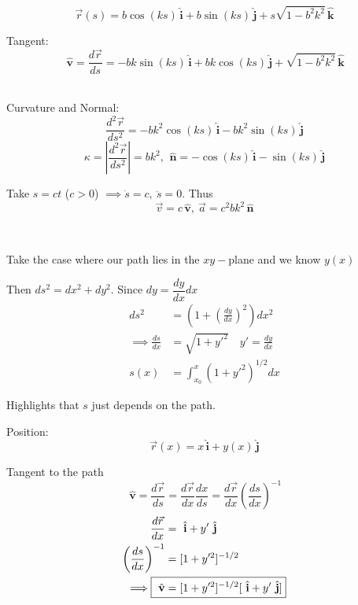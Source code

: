 \documentclass[twoside]{scrartcl}
\let\oldhat\hat
\renewcommand{\hat}[1]{\,\oldhat{\boldsymbol{\mathbf{#1}}}}
\begin{document}
\pagebreak


\begin{example}
	\[\vec{r}(s) = b\cos(ks)\hat{i} + b\sin(ks)\hat{j} + s\sqrt{1-b^2k^2}\hat{k}\]
	
	Tangent:
	\[\hat{v} = \frac{d\vec{r}}{ds} = -bk\sin(ks)\hat{i} + bk\cos(ks)\hat{j} + \sqrt{1-b^2k^2}\hat{k}\]~
	
	Curvature and Normal:
	\[\frac{d^2\vec{r}}{ds^2} = -bk^2\cos(ks)\hat{i} -bk^2 \sin(ks)\hat{j}\]
	\[\kappa =\left|\frac{d^2\vec{r}}{ds^2}\right| = bk^2,~ \hat{n} =  -\cos(ks)\hat{i} -\sin(ks)\hat{j}\]
	
Take $s = ct$ ($c >0$) $ \implies \dot{s} =c,~ \ddot{s} = 0$. Thus
\[\vec{v} = c\hat{v},~\vec{a} = c^2bk^2\hat{n}\]	
\end{example}~

Take the case where our path lies in the $xy-$plane and we know $y(x)$
\begin{center}
\end{center}

Then $ds^2 = dx^2 + dy^2$. Since $dy = \dfrac{dy}{dx}dx$ 
\[\begin{aligned}
ds^2 &= \left(1 + \left(\frac{dy}{dx}\right)^2\right)dx^2\\
\implies \frac{ds}{dx} &= \sqrt{1 + y'^2}\quad y' = \frac{dy}{dx}\\
s(x) &= \int_{x_0}^x (1 + y'^2)^{1/2}dx
\end{aligned}\]

Highlights that $s$ just depends on the path. 


Position: \[\vec{r}(x) = x\hat{i} + y(x)\hat{j}\]

Tangent to the path
\[\hat{v} = \frac{d\vec{r}}{ds} = \frac{d\vec{r}}{dx}\frac{dx}{ds} = \frac{d\vec{r}}{dx}\left(\frac{ds}{dx}\right)^{-1}\]
\[\begin{aligned}
\frac{d\vec{r}}{dx} &= \hat{i} + y'\hat{j}\\
\left(\frac{ds}{dx}\right)^{-1} &= [1 + y'^2]^{-1/2}\\
\implies \Aboxed{\hat{v} &= [1+y'^2]^{-1/2}[\hat{i} + y'\hat{j}]}
\end{aligned}\]
\end{document}
